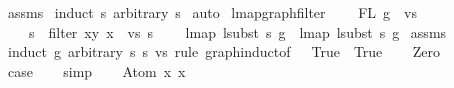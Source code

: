 \begin{isabellebody}
%
\isadelimproof
%
\endisadelimproof
%
\isatagproof
{}\isamarkupfalse%
\ assms\isanewline
{}\isamarkupfalse%
\ {\isacharparenleft}{\kern0pt}induct\ s\ arbitrary{\isacharcolon}{\kern0pt}\ s{}{\isacharparenright}{\kern0pt}\isanewline
{}\isamarkupfalse%
\ auto%
\endisatagproof
{\isafoldproof}%
%
\isadelimproof
\isanewline
%
\endisadelimproof
\isanewline
\isanewline
{}\isamarkupfalse%
\ lmap{\isacharunderscore}{\kern0pt}graph{\isacharunderscore}{\kern0pt}filter{\isacharcolon}{\kern0pt}\isanewline
\ \ \ \ {\isachardoublequoteopen}FL\ g\ {\isasymsubseteq}\ vs{\isachardoublequoteclose}\isanewline
\ \ \ \ {\isachardoublequoteopen}s{}\ {\isacharequal}{\kern0pt}\ filter\ {\isacharparenleft}{\kern0pt}{\isasymlambda}{\isacharparenleft}{\kern0pt}x{\isacharcomma}{\kern0pt}y{\isacharparenright}{\kern0pt}{\isachardot}{\kern0pt}\ x\ {\isasymin}\ vs{\isacharparenright}{\kern0pt}\ s{\isachardoublequoteclose}\isanewline
\ \ \ \ {\isachardoublequoteopen}lmap\ {\isacharparenleft}{\kern0pt}lsubst\ s{\isacharparenright}{\kern0pt}\ g\ {\isacharequal}{\kern0pt}\ lmap\ {\isacharparenleft}{\kern0pt}lsubst\ s{}{\isacharparenright}{\kern0pt}\ g{\isachardoublequoteclose}\isanewline
%
\isadelimproof
%
\endisadelimproof
%
\isatagproof
{}\isamarkupfalse%
\ assms\isanewline
{}\isamarkupfalse%
\ {\isacharparenleft}{\kern0pt}induct\ g\ arbitrary{\isacharcolon}{\kern0pt}\ s\ s{}\ vs\ rule{\isacharcolon}{\kern0pt}\ graph{\isachardot}{\kern0pt}induct{\isacharbrackleft}{\kern0pt}of\ {\isacharunderscore}{\kern0pt}\ {\isachardoublequoteopen}{\isacharpercent}{\kern0pt}{\isacharunderscore}{\kern0pt}{\isachardot}{\kern0pt}\ True{\isachardoublequoteclose}\ {\isachardoublequoteopen}{\isacharpercent}{\kern0pt}{\isacharunderscore}{\kern0pt}{\isachardot}{\kern0pt}\ True{\isachardoublequoteclose}{\isacharbrackright}{\kern0pt}{\isacharparenright}{\kern0pt}\isanewline
\ \ \isamarkupfalse%
\ Zero\isanewline
\ \ \isamarkupfalse%
\ \isamarkupfalse%
\ {\isacharquery}{\kern0pt}case\isanewline
\ \ \isamarkupfalse%
\ simp\isanewline
{}\isamarkupfalse%
\isanewline
\ \ \isamarkupfalse%
\ {\isacharparenleft}{\kern0pt}Atom\ x{}\ x{}{\isacharparenright}{\kern0pt}\isanewline
\ \ \isamarkupfalse%
\ \isamarkupfalse%

\end{isabellebody}
